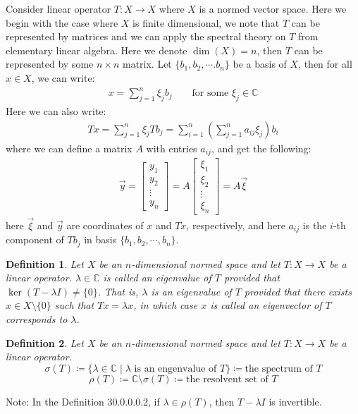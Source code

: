 \documentclass[11pt]{book}
\theoremstyle{break}
\theoremstyle{break}
\newtheorem{defn}{Definition}[corL]
\newcommand{\C}{\mathbb{C}}
\newcommand{\bmat}[1]{\begin{bmatrix} #1 \end{bmatrix}}
\newcommand{\note}{\color{red}Note: \color{black}}
\begin{document}
Consider linear operator $T:X \to X$ where $X$ is a normed vector space. Here we begin with the case where $X$ is finite dimensional, we note that $T$ can be represented by matrices and we can apply the spectral theory on $T$ from elementary linear algebra. Here we denote $\dim(X) = n$, then $T$ can be represented by some $n\times n$ matrix. Let $\{b_1,b_2,\cdots. b_n\}$ be a basis of $X$, then for all $x \in X$, we can write:
\begin{align*}
x = \sum_{j=1}^n \xi_j b_j \qquad\text{for some }\xi_j \in \C
\end{align*}
Here we can also write:
\begin{align*}
Tx = \sum_{j=1}^n \xi_j Tb_j = \sum_{i=1}^n \left(\sum_{j=1}^n a_{ij}\xi_j\right)b_i
\end{align*}
where we can define a matrix $A$ with entries $a_{ij}$, and get the following:
\begin{align*}
\vec{y} = \bmat{y_1\\y_2 \\ \vdots \\ y_n} = A\bmat{\xi_1\\\xi_2 \\ \vdots \\ \xi_n}= A\vec{\xi}
\end{align*}
here $\vec{\xi}$ and $\vec{y}$ are coordinates of $x$ and $Tx$, respectively, and here $a_{ij}$ is the $i$-th component of $Tb_j$ in basis $\{b_1,b_2,\cdots, b_n\}$.\\

\begin{defn}
Let $X$ be an $n$-dimensional normed space and let $T:X \to X$ be a linear operator. $\lambda \in \C$ is called an eigenvalue of $T$ provided that $\ker(T-\lambda I) \neq \{0\}$. That is, $\lambda$ is an eigenvalue of $T$ provided that there exists $x \in X\setminus \{0\}$ such that $Tx = \lambda x$, in which case $x$ is called an eigenvector of $T$ corresponds to $\lambda$. 
\end{defn}

\begin{defn}
Let $X$ be an $n$-dimensional normed space and let $T:X \to X$ be a linear operator.
$$\sigma(T)\coloneqq \{ \lambda \in \C \mid \lambda \text{ is an engenvalue of }T\}\coloneqq \text{the spectrum of }T $$
$$\rho(T) \coloneqq \C \setminus \sigma(T) \coloneqq \text{the resolvent set of }T$$
\end{defn}
\note In the Definition 30.0.0.0.2, if $\lambda \in \rho(T)$, then $T-\lambda I$ is invertible. \\
\end{document}
